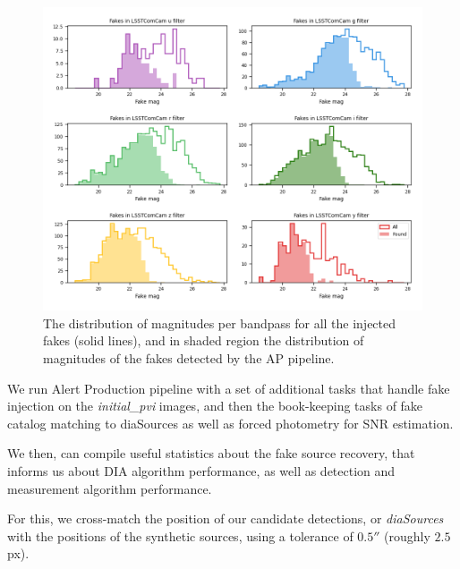 \begin{figure}
    \centering
    \includegraphics[width=0.95\linewidth]{dia/figures/simple_hist_completeness_mag_per_filter.png}
    \caption{The distribution of magnitudes per bandpass for all the injected fakes (solid lines), and in shaded region the distribution of magnitudes of the fakes detected by the AP pipeline.}
    \label{fig:found_fakes_per_Filter}
\end{figure}


We run Alert Production pipeline with a set of additional tasks that handle fake injection on the \textit{initial\_pvi} images, and then the book-keeping tasks of fake catalog matching to diaSources as well as forced photometry for SNR estimation.

We then, can compile useful statistics about the fake source recovery, that informs us about DIA algorithm performance, as well as detection and measurement algorithm performance. 

For this, we cross-match the position of our candidate detections, or \textit{diaSources} with the positions of the synthetic sources, using a tolerance of $0.5''$ (roughly $2.5$px). 


